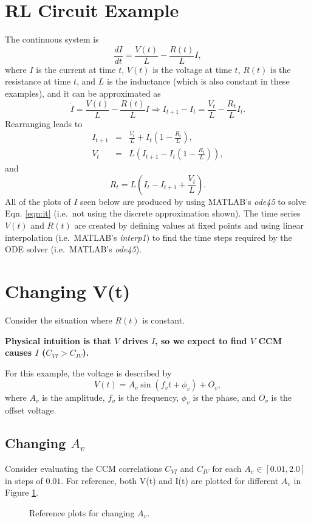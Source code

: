 \documentclass{article}
\begin{document}
\section{RL Circuit Example}
The continuous system is
\begin{equation}
\label{eqn:it}
\frac{dI}{dt} = \frac{V(t)}{L} - \frac{R(t)}{L} I,
\end{equation}
where $I$ is the current at time $t$, $V(t)$ is the voltage at time $t$, $R(t)$ is the resistance at time $t$, and $L$ is the inductance (which is also constant in these examples), and it can be approximated as
\begin{equation}
\dot{I} = \frac{V(t)}{L} - \frac{R(t)}{L} I\Rightarrow I_{t+1}-I_t = \frac{V_t}{L} - \frac{R_t}{L} I_t.
\end{equation}
Rearranging leads to
\begin{eqnarray}
I_{t+1} &=& \frac{V_t}{L}+I_t\left(1-\frac{R_t}{L}\right),\\
V_t &=& L\left(I_{t+1}-I_t\left(1-\frac{R_t}{L}\right)\right),
\end{eqnarray}
and
\begin{equation}
R_t = L\left(I_t-I_{t+1}+\frac{V_t}{L}\right).
\end{equation}
All of the plots of $I$ seen below are produced by using MATLAB's {\em ode45} to solve Eqn. \ref{eqn:it} (i.e.\ not using the discrete approximation shown).  The time series $V(t)$ and $R(t)$ are created by defining values at fixed points and using linear interpolation (i.e.\ MATLAB's {\em interp1}) to find the time steps required by the ODE solver (i.e.\ MATLAB's {\em ode45}).  

\section{Changing V(t)}
Consider the situation where $R(t)$ is constant.
\begin{center}
{\large {\bf Physical intuition is that $V$ drives $I$, so we expect to find $V$ CCM causes $I$ ($C_{VI}>C_{IV}$).}}
\end{center}
For this example, the voltage is described by 
\begin{equation}
V(t) = A_v \sin\left(f_v t+\phi_v\right)+O_v,
\end{equation}
where $A_v$ is the amplitude, $f_v$ is the frequency, $\phi_v$ is the phase, and $O_v$ is the offset voltage.

\subsection{Changing $A_v$}
Consider evaluating the CCM correlations $C_{VI}$ and $C_{IV}$ for each $A_v\in[0.01,2.0]$ in steps of $0.01$.  For reference, both V(t) and I(t) are plotted for different $A_v$ in Figure \ref{fig:Avref}.
\begin{figure}[H]
\caption{Reference plots for changing $A_v$.}
\label{fig:Avref}
\end{figure}
\end{document}
